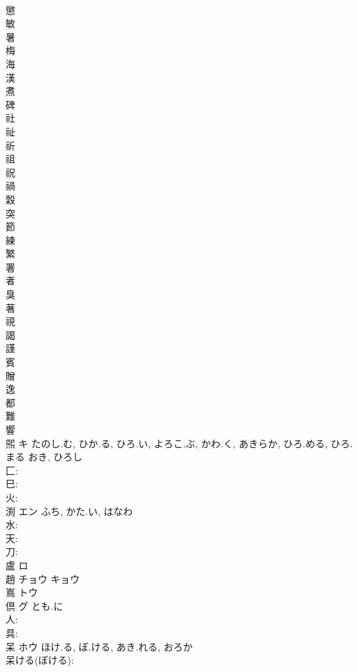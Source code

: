 \documentclass[8pt]{extreport}
\begin{document}
\begin{CJK}{UTF8}{min}
\\	懲						
\\	敏						
\\	暑						
\\	梅						
\\	海						
\\	漢						
\\	煮						
\\	碑						
\\	社						
\\	祉						
\\	祈						
\\	祖						
\\	祝						
\\	禍						
\\	穀						
\\	突						
\\	節						
\\	練						
\\	繁						
\\	署						
\\	者						
\\	臭						
\\	著						
\\	視						
\\	謁						
\\	謹						
\\	賓						
\\	贈						
\\	逸						
\\	都						
\\	難						
\\	響						
\\	煕	キ	たのし.む, ひか.る, ひろ.い, よろこ.ぶ, かわ.く, あきらか, ひろ.める, ひろ.まる	おき, ひろし	
\\	匚: 
\\	巳: 
\\	火: 
\\	渕	エン	ふち, かた.い, はなわ		
\\	水: 
\\	天: 
\\	刀: 
\\	盧	ロ			
\\	趙	チョウ キョウ			
\\	嶌	トウ			
\\	倶	グ	とも.に		
\\	人: 
\\	具: 
\\	呆	ホウ	ほけ.る, ぼ.ける, あき.れる, おろか		
\\	呆ける(ぼける): 

\end{CJK}
\end{document}
